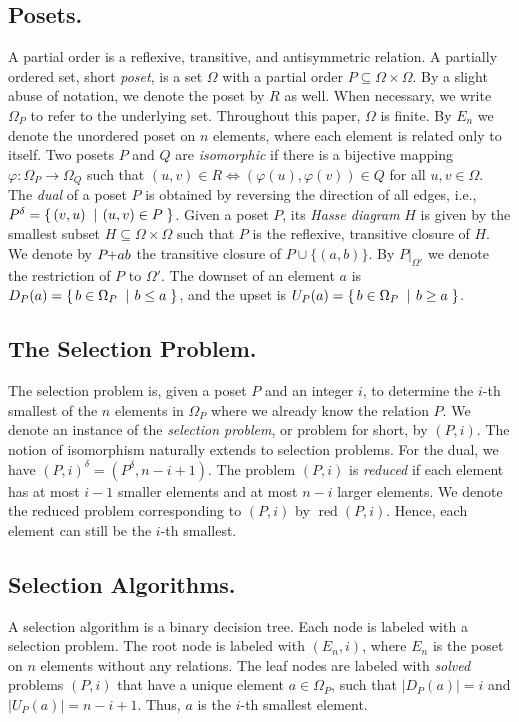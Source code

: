 \documentclass[twoside,leqno,twocolumn]{article}
\makeatletter
\newcommand{\set}[2]{\left\{\, \mathinner{#1}\vphantom{#2}\: \left|\: \vphantom{#1}\mathinner{#2} \right.\,\right\}}
\newcommand\ie{i.e\@., }
\newcommand{\sse}{\subseteq}
\newcommand{\pchild}[3]{{#1}\kern-1pt{+}{#2}{#3}}
\newcommand{\dual}[1]{{#1}^{\delta}}
\newcommand{\reduced}[1]{\operatorname{red}{#1}}
\newcommand{\less}[2]{D_{#1}(#2)}
\newcommand{\greater}[2]{U_{#1}(#2)}
\makeatother
\begin{document}
\subsection{Posets.}
A partial order is a reflexive, transitive, and antisymmetric relation.
A partially ordered set, short \emph{poset}, is a set $\Omega$ with a partial order $P \subseteq \Omega \times \Omega$.
By a slight abuse of notation, we denote the poset by $R$ as well.
When necessary, we write $\Omega_P$ to refer to the underlying set.
Throughout this paper, $\Omega$ is finite.
By $E_n$ we denote the unordered poset on $n$ elements, where each element is related only to itself.
Two posets $P$ and $Q$ are \emph{isomorphic} if there is a bijective mapping $\varphi: \Omega_P \to \Omega_Q$ such that $(u, v) \in R \iff (\varphi(u), \varphi(v)) \in Q$ for all $u, v \in \Omega$.
The \emph{dual} of a poset $P$ is obtained by reversing the direction of all edges, \ie $\dual{P} = \set{(v,u)}{(u,v) \in P}$.
Given a poset $P$, its \emph{Hasse diagram} $H$ is given by the smallest subset $H \sse \Omega \times \Omega$ such that $P$ is the reflexive, transitive closure of $H$.
We denote by $\pchild{P}{a}{b}$ the transitive closure of $P \cup \{(a, b)\}$.
By $P|_{\Omega'}$ we denote the restriction of $P$ to $\Omega'$.
The downset of an element $a$ is $\less{P}{a} = \set{b \in \Omega_P}{b \le a}$, and the upset is $\greater{P}{a} = \set{b \in \Omega_P}{b \ge a}$.

\subsection{The Selection Problem.}
The selection problem is, given a poset $P$ and an integer $i$, to determine the $i$-th smallest of the $n$ elements in $\Omega_P$ where we already know the relation $P$.
We denote an instance of the \emph{selection problem}, or problem for short, by $(P, i)$.
The notion of isomorphism naturally extends to selection problems.
For the dual, we have $\dual{(P, i)} = (\dual{P}, n - i + 1)$.
The problem $(P, i)$ is \emph{reduced} if each element has at most $i - 1$ smaller elements and at most $n - i$ larger elements.
We denote the reduced problem corresponding to $(P, i)$ by $\reduced{(P, i)}$.
Hence, each element can still be the $i$-th smallest.

\subsection{Selection Algorithms.}
A selection algorithm is a binary decision tree.
Each node is labeled with a selection problem.
The root node is labeled with $(E_n, i)$, where $E_n$ is the poset on $n$ elements without any relations.
The leaf nodes are labeled with \emph{solved} problems $(P, i)$ that have a unique element $a \in \Omega_P$, such that $|\less{P}{a}| = i$ and $|\greater{P}{a}| = n - i + 1$.
Thus, $a$ is the $i$-th smallest element.
\end{document}
